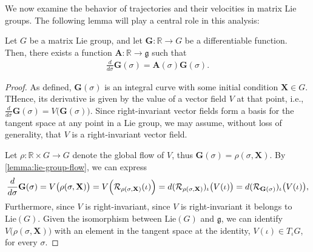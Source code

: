 We now examine the behavior of trajectories and their velocities in matrix Lie groups. The following lemma will play a central role in this analysis:
\begin{lemma} \label{lemma:derivative-lie-element-H-parallelizable} Let $G$ be a matrix Lie group, and let $\mathbf{G}:\mathbb{R}\to G$ be a differentiable function. Then, there exists a function $\mathbf{A}:\mathbb{R} \to \mathfrak{g}$ such that 
\begin{align}
    \frac{d}{d\sigma} \mathbf{G}(\sigma) = \mathbf{A}(\sigma) \mathbf{G}(\sigma). \label{eq:derivative-lie-element-H-parallelizable}
\end{align}
\end{lemma}
\begin{proof}
    As defined, $\mathbf{G}(\sigma)$ is an integral curve with some initial condition $\mathbf{X}\in G$. THence, its derivative is given by the value of a vector field $V$ at that point, i.e., $\frac{d}{d\sigma}\mathbf{G}(\sigma) = V\bigl(\mathbf{G}(\sigma)\bigr)$. Since right-invariant vector fields form a basis for the tangent space at any point in a Lie group, we may assume, without loss of generality, that $V$ is a right-invariant vector field.

    Let $\rho: \mathbb{R} \times G \to G$ denote the global flow of $V$, thus $\mathbf{G}(\sigma) = \rho(\sigma, \mathbf{X})$. By \cref{lemma:lie-group-flow}, we can express
    \begin{align}
        \frac{d}{d\sigma} \mathbf{G}(\sigma) = V\bigl(\rho(\sigma, \mathbf{X})\bigr) = V\Bigl(\mathcal{R}_{\rho(\sigma, \mathbf{X})}(\iota)\Bigr) = d(\mathcal{R}_{\rho(\sigma, \mathbf{X})})_{\iota}\bigl(V(\iota)\bigr) = d(\mathcal{R}_{\mathbf{G}(\sigma)})_{\iota}\bigl(V(\iota)\bigr),
    \end{align}
    Furthermore, since $V$ is right-invariant, since $V$ is right-invariant it belongs to $\text{Lie}(G)$. Given the isomorphism between $\text{Lie}(G)$ and $\mathfrak{g}$, we can identify $V\bigl(\rho(\sigma, \mathbf{X})\bigr)$ with an element in the tangent space at the identity, $V(\iota)\in T_\iota G$, for every $\sigma$. 
    

\end{proof}
